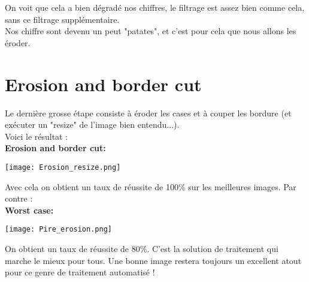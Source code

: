 On voit que cela a bien dégradé nos chiffres, le filtrage est assez bien comme cela, sans ce filtrage supplémentaire. \\
Nos chiffre sont devenu un peut "patates", et c'est pour cela que nous allons les éroder.

\pagebreak
\section{Erosion and border cut}

Le dernière grosse étape consiste à éroder les cases et à couper les bordure (et exécuter un "resize" de l'image bien entendu...).\\
Voici le résultat : \\

\textbf{Erosion and border cut:}
\begin{center} 
\hspace{15cm}
\texttt{[image: Erosion\_resize.png]}
\end{center}
\vspace{0.1cm} 
Avec cela on obtient un taux de réussite de 100\% sur les meilleures images. Par contre :\\

\textbf{Worst case:}
\begin{center} 
\hspace{15cm}
\texttt{[image: Pire\_erosion.png]}
\end{center}
\vspace{0.1cm} 
On obtient un taux de réussite de 80\%. C'est la solution de traitement qui marche le mieux pour tous. Une bonne image restera toujours un excellent atout pour ce genre de traitement automatisé !

